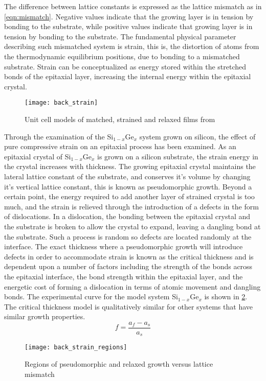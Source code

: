 The difference between lattice constants is expressed as the lattice mismatch as in \cref{eqn:mismatch}. Negative values indicate that the growing layer is in tension by bonding to the substrate, while positive values indicate that growing layer is in tension by bonding to the substrate. The fundamental physical parameter describing such mismatched system is strain, this is, the distortion of atoms from the thermodynamic equilibrium positions, due to bonding to a mismatched substrate. Strain can be conceptualized as energy stored within the stretched bonds of the epitaxial layer, increasing the internal energy within the epitaxial crystal.
\begin{figure}
    \centering
    \texttt{[image: back\_strain]}
    \caption[Unit cell strain visualization]{\label{fig:back_strain}Unit cell models of matched, strained and relaxed films from \cite{ohring2001materials}}
\end{figure}

Through the examination of the Si$_{1-x}$Ge$_x$ system grown on silicon, the effect of pure compressive strain on an epitaxial process has been examined. As an epitaxial crystal of Si$_{1-x}$Ge$_x$ is grown on a silicon substrate, the strain energy in the crystal increases with thickness. The growing epitaxial crystal maintains the lateral lattice constant of the substrate, and conserves it's volume by changing it's vertical lattice constant, this is known as pseudomorphic growth. Beyond a certain point, the energy required to add another layer of strained crystal is too much, and the strain is relieved through the introduction of a defects in the form of dislocations. In a dislocation, the bonding between the epitaxial crystal and the substrate is broken to allow the crystal to expand, leaving a dangling bond at the substrate. Such a process is random so defects are located randomly at the interface. The exact thickness where a pseudomorphic growth will introduce defects in order to accommodate strain is known as the critical thickness and is dependent upon a number of factors including the strength of the bonds across the epitaxial interface, the bond strength within the epitaxial layer, and the energetic cost of forming a dislocation in terms of atomic movement and dangling bonds. The experimental curve for the model system Si$_{1-x}$Ge$_x$  is shown in \cref{fig:back_strain_regions}. The critical thickness model is qualitatively similar for other systems that have similar growth properties.
\begin{equation}
f = \frac{a_f - a_s}{a_s} \label{eqn:mismatch}
\end{equation}
\begin{figure}
    \centering
    \texttt{[image: back\_strain\_regions]}
    \caption[Phase diagram of strain]{\label{fig:back_strain_regions}Regions of pseudomorphic and relaxed growth versus lattice mismatch\cite{Bean1986}}
\end{figure}
